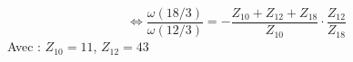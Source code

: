 \documentclass[10pt,fleqn]{article} %
\begin{document}
$$
\Leftrightarrow 
\dfrac{\omega\left( 18/3 \right)}{\omega\left( 12/3\right)}
= -\dfrac{Z_{10}+Z_{12}+Z_{18}}{Z_{10}} \cdot \dfrac{Z_{12}}{Z_{18}}
$$
Avec : 
$Z_{10}=11$, $Z_{12}=43$


\end{document}
